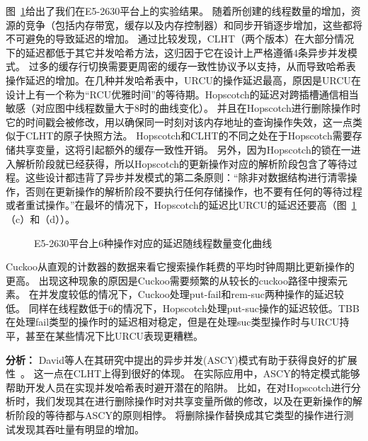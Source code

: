 图~\ref{fig:latency}给出了我们在E5-2630平台上的实验结果。
随着所创建的线程数量的增加，资源的竞争（包括内存带宽，缓存以及内存控制器）和同步开销逐步增加，这些都将不可避免的导致延迟的增加。
通过比较发现，CLHT（两个版本）在大部分情况下的延迟都低于其它并发哈希方法，这归因于它在设计上严格遵循4条异步并发模式。
过多的缓存行切换需要更周密的缓存一致性协议予以支持，从而导致哈希表操作延迟的增加。在几种并发哈希表中，URCU的操作延迟最高，原因是URCU在设计上有一个称为“RCU优雅时间”的等待期。Hopscotch的延迟对跨插槽通信相当敏感（对应图中线程数量大于8时的曲线变化）。
并且在Hopscotch进行删除操作时它的时间戳会被修改，用以确保同一时刻对该内存地址的查询操作失效，这一点类似于CLHT的原子快照方法。
Hopscotch和CLHT的不同之处在于Hopscotch需要存储共享变量，这将引起额外的缓存一致性开销。
另外，因为Hopscotch的锁在一进入解析阶段就已经获得，所以Hopscotch的更新操作对应的解析阶段包含了等待过程。这些设计都违背了异步并发模式的第二条原则：“除非对数据结构进行清零操作，否则在更新操作的解析阶段不要执行任何存储操作，也不要有任何的等待过程或者重试操作。”在最坏的情况下，Hopscotch的延迟比URCU的延迟还要高（图~\ref{fig:latency}（c）和（d））。

\begin{figure}[htbp]
\centering
\caption{E5-2630平台上6种操作对应的延迟随线程数量变化曲线}
\label{fig:latency}
\end{figure}

Cuckoo从直观的计数器的数据来看它搜索操作耗费的平均时钟周期比更新操作的更高。
出现这种现象的原因是Cuckoo需要频繁的从较长的cuckoo路径中搜索元素。
在并发度较低的情况下，Cuckoo处理put-fail和rem-suc两种操作的延迟较低。
同样在线程数低于6的情况下，Hopscotch处理put-suc操作的延迟较低。TBB在处理fail类型的操作时的延迟相对稳定，但是在处理suc类型操作时与URCU持平，甚至在某些情况下比URCU表现更糟糕。

\textbf{分析：} David等人在其研究中提出的异步并发(ASCY)模式有助于获得良好的扩展性~\cite{clht}。
这一点在CLHT上得到很好的体现。
在实际应用中，ASCY的特定模式能够帮助开发人员在实现并发哈希表时避开潜在的陷阱。
比如，在对Hopscotch进行分析时，我们发现其在进行删除操作时对共享变量所做的修改，以及在更新操作的解析阶段的等待都与ASCY的原则相悖。
将删除操作替换成其它类型的操作进行测试发现其吞吐量有明显的增加。


